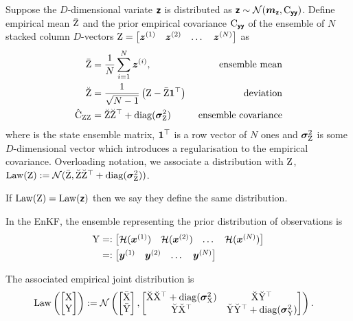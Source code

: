\documentclass{article}
\begin{document}
{Suppose the $D$-dimensional variate $\boldsymbol{\mathsf{z}}$ is distributed as
$\boldsymbol{\mathsf{z}}\sim\mathcal{N}(\boldsymbol{m}_{\boldsymbol{\mathsf{z}}},\mathrm{C}_{\boldsymbol{\mathsf{yy}}})$.
Define empirical mean $\bar{\mathrm{Z}}$ and the prior empirical covariance $\mathrm{C}_{\boldsymbol{\mathsf{yy}}}$ of the ensemble of $N$ stacked column $D$-vectors  $\mathrm{Z} = \begin{bmatrix}\boldsymbol{z}^{(1)}& \boldsymbol{z}^{(2)}& \dots& \boldsymbol{z}^{(N)}\end{bmatrix}$ as
\begin{align}
    \bar{\mathrm{Z}} &= \frac{1}{N} \sum_{i=1}^N \boldsymbol{z}^{(i)}, \label{eq:ensemble_mean} & \text{ ensemble mean} \\
    \breve{\mathrm{Z}} &= \frac{1}{\sqrt{N-1}} \left( \mathrm{Z} - \bar{\mathrm{Z}} \boldsymbol{1}^\top \right) &\text{ deviation}  \label{eq:deviation_matrix} \\
    \hat{\mathrm{C}}_{\mathrm{ZZ}} &= \breve{\mathrm{Z}} \breve{\mathrm{Z}}^\top + \operatorname{diag}(\boldsymbol{\sigma}_{\mathrm{Z}}^2)&\text{ ensemble covariance}  \label{eq:ensemble-covariance}
\end{align}
where is the state ensemble matrix, $\boldsymbol{1}^\top$ is a row vector of $N$ ones and $\boldsymbol{\sigma}_{\mathrm{Z}}^2$ is some $D$-dimensional vector which introduces a regularisation to the empirical covariance.
Overloading notation, we associate a distribution with $\mathrm{Z}$,
$\operatorname{Law}(\mathrm{Z}) := \mathcal{N}(\bar{\mathrm{Z}}, \breve{\mathrm{Z}} \breve{\mathrm{Z}}^\top + \operatorname{diag}(\boldsymbol{\sigma}_{\mathrm{Z}}^2))$.

If $\operatorname{Law}(\mathrm{Z})=\operatorname{Law}(\boldsymbol{\mathsf{z}})$ then we say they define the same distribution.

In the EnKF, the ensemble representing the prior distribution of observations is
\begin{align}
    \mathrm{Y} &=: \begin{bmatrix}\mathcal{H}(\boldsymbol{x}^{(1)}) & \mathcal{H}(\boldsymbol{x}^{(2)})& \dots& \mathcal{H}(\boldsymbol{x}^{(N)})\end{bmatrix}\\
    &=: \begin{bmatrix}\boldsymbol{y}^{(1)}& \boldsymbol{y}^{(2)}& \dots& \boldsymbol{y}^{(N)}\end{bmatrix}
\end{align}


The associated empirical joint distribution is
\begin{align}
    \operatorname{Law}\left(\begin{bmatrix}
        \mathrm{X}\\
        \mathrm{Y}
    \end{bmatrix}\right) &:= \mathcal{N}\left(\begin{bmatrix}
        \bar{\mathrm{X}}\\
        \bar{\mathrm{Y}}
    \end{bmatrix},
    \begin{bmatrix}
        \breve{\mathrm{X}} \breve{\mathrm{X}}^\top + \operatorname{diag}(\boldsymbol{\sigma}_{\mathrm{X}}^2) & \breve{\mathrm{X}} \breve{\mathrm{Y}}^\top \\
        \breve{\mathrm{Y}} \breve{\mathrm{X}}^\top  & \breve{\mathrm{Y}} \breve{\mathrm{Y}}^\top + \operatorname{diag}(\boldsymbol{\sigma}_{\mathrm{Y}}^2)
    \end{bmatrix}
    \right).
\end{align}

}
\end{document}
